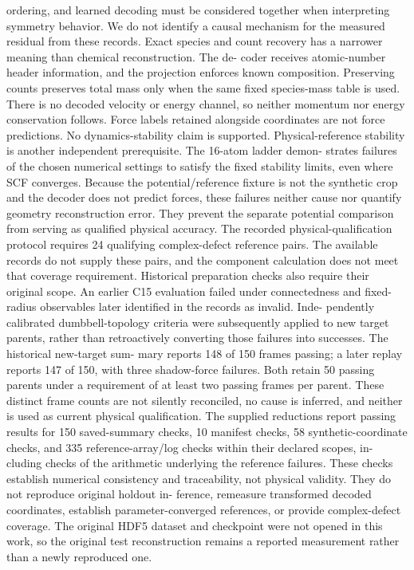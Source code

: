 \documentclass[11pt]{article}
\begin{document}
ordering, and learned decoding must be considered together when interpreting symmetry behavior.
We do not identify a causal mechanism for the measured residual from these records.
Exact species and count recovery has a narrower meaning than chemical reconstruction. The de-
coder receives atomic-number header information, and the projection enforces known composition.
Preserving counts preserves total mass only when the same fixed species-mass table is used. There
is no decoded velocity or energy channel, so neither momentum nor energy conservation follows.
Force labels retained alongside coordinates are not force predictions. No dynamics-stability claim
is supported.
Physical-reference stability is another independent prerequisite. The 16-atom ladder demon-
strates failures of the chosen numerical settings to satisfy the fixed stability limits, even where
SCF converges. Because the potential/reference fixture is not the synthetic crop and the decoder
does not predict forces, these failures neither cause nor quantify geometry reconstruction error.
They prevent the separate potential comparison from serving as qualified physical accuracy. The
recorded physical-qualification protocol requires 24 qualifying complex-defect reference pairs. The
available records do not supply these pairs, and the component calculation does not meet that
coverage requirement.
Historical preparation checks also require their original scope. An earlier C15 evaluation failed
under connectedness and fixed-radius observables later identified in the records as invalid. Inde-
pendently calibrated dumbbell-topology criteria were subsequently applied to new target parents,
rather than retroactively converting those failures into successes. The historical new-target sum-
mary reports 148 of 150 frames passing; a later replay reports 147 of 150, with three shadow-force
failures. Both retain 50 passing parents under a requirement of at least two passing frames per
parent. These distinct frame counts are not silently reconciled, no cause is inferred, and neither is
used as current physical qualification.
The supplied reductions report passing results for 150 saved-summary checks, 10 manifest checks,
58 synthetic-coordinate checks, and 335 reference-array/log checks within their declared scopes, in-
cluding checks of the arithmetic underlying the reference failures. These checks establish numerical
consistency and traceability, not physical validity. They do not reproduce original holdout in-
ference, remeasure transformed decoded coordinates, establish parameter-converged references, or
provide complex-defect coverage. The original HDF5 dataset and checkpoint were not opened in
this work, so the original test reconstruction remains a reported measurement rather than a newly
reproduced one.
\end{document}
